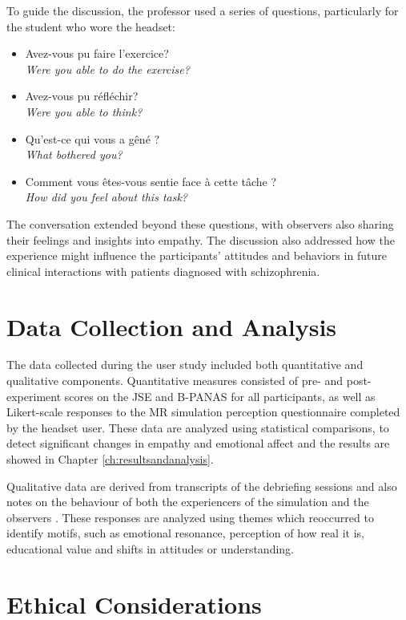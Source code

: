 To guide the discussion, the professor used a series of questions, particularly for the student who wore the headset:
\begin{itemize}
    \item Avez-vous pu faire l'exercice? \\
    \textit{Were you able to do the exercise?}
    \item Avez-vous pu réfléchir? \\
    \textit{Were you able to think?}
    \item Qu'est-ce qui vous a gêné ? \\
    \textit{What bothered you?}
    \item Comment vous êtes-vous sentie face à cette tâche ? \\ 
    \textit{How did you feel about this task?}
\end{itemize}
The conversation extended beyond these questions, with observers also sharing their feelings and insights into empathy. The discussion also addressed how the experience might influence the participants' attitudes and behaviors in future clinical interactions with patients diagnosed with schizophrenia.

\section{Data Collection and Analysis}

The data collected during the user study included both quantitative and qualitative components. Quantitative measures consisted of pre- and post-experiment scores on the JSE and B-PANAS for all participants, as well as Likert-scale responses to the MR simulation perception questionnaire completed by the headset user. These data are analyzed using statistical comparisons, to detect significant changes in empathy and emotional affect and the results are showed in Chapter \ref{ch:resultsandanalysis}. 

\vspace{1em}

Qualitative data are derived from transcripts of the debriefing sessions and also notes on the behaviour of both the experiencers of the simulation and the observers . These responses are analyzed using themes which reoccurred to identify motifs, such as emotional resonance, perception of how real it is, educational value and shifts in attitudes or understanding.

\section{Ethical Considerations}

